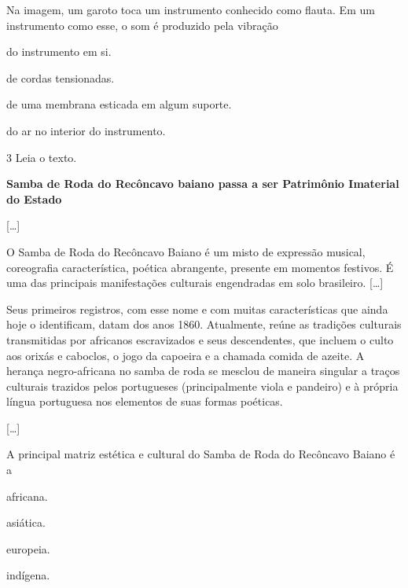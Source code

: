 Na imagem, um garoto toca um instrumento conhecido como flauta. Em um instrumento como esse, o som é produzido pela vibração

\begin{escolha}
\item
  do instrumento em si.
\item
  de cordas tensionadas.
\item
  de uma membrana esticada em algum suporte.
\item
  do ar no interior do instrumento.
\end{escolha}



\pagebreak
\num{3}  Leia o texto.

\begin{myquote}
\textbf{Samba de Roda do Recôncavo baiano passa a ser Patrimônio Imaterial do Estado}

{[}\ldots{}{]}

O Samba de Roda do Recôncavo Baiano é um misto de expressão musical,
coreografia característica, poética abrangente, presente em momentos
festivos. É uma das principais manifestações culturais engendradas em
solo brasileiro. {[}\ldots{}{]}

Seus primeiros registros, com esse nome e com muitas características que
ainda hoje o identificam, datam dos anos 1860. Atualmente, reúne as
tradições culturais transmitidas por africanos escravizados e seus
descendentes, que incluem o culto aos orixás e caboclos, o jogo da
capoeira e a chamada comida de azeite. A herança negro-africana no samba
de roda se mesclou de maneira singular a traços culturais trazidos pelos
portugueses (principalmente viola e pandeiro) e à própria língua
portuguesa nos elementos de suas formas poéticas.

{[}\ldots{}{]}

\end{myquote}

A principal matriz estética e cultural do Samba de Roda do Recôncavo Baiano é a

\begin{escolha}
\item
  africana.
\item
  asiática.
\item
  europeia.
\item
  indígena.
\end{escolha}


